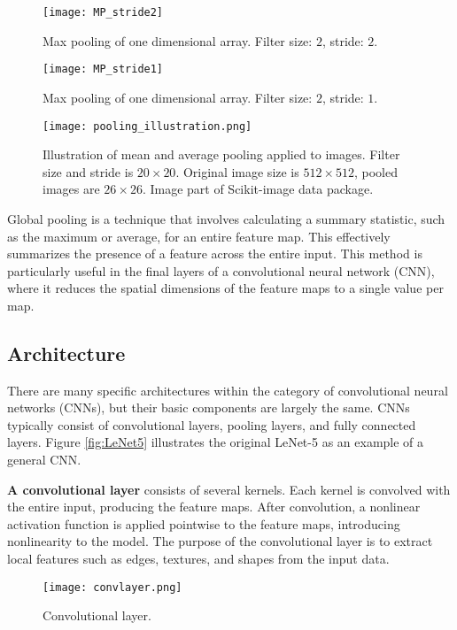 \documentclass[../../thesis.tex]{subfiles}
\begin{document}
\begin{figure}[h]
    \texttt{[image: MP\_stride2]}
    \centering    
    \caption{Max pooling of one dimensional array. Filter size: $2$, stride: $2$.}
    \label{fig:mp2}
\end{figure}
\begin{figure}[h]
    \texttt{[image: MP\_stride1]}
    \centering    
    \caption{Max pooling of one dimensional array. Filter size: $2$, stride: $1$.}
    \label{fig:mp1}
\end{figure}

\begin{figure}[h]
    \centering
    \texttt{[image: pooling\_illustration.png]}
    \caption{Illustration of mean and average pooling applied to images. Filter size and stride is $20\times 20$. Original image size is $512\times 512$, pooled images are $26\times26$. Image part of Scikit-image data package.}
    \label{fig:mean_max_pool}
\end{figure}

Global pooling is a technique that involves calculating a summary statistic, such as the maximum or average, for an entire feature map. This effectively summarizes the presence of a feature across the entire input. This method is particularly useful in the final layers of a convolutional neural network (CNN), where it reduces the spatial dimensions of the feature maps to a single value per map.

\subsection{Architecture}
There are many specific architectures within the category of convolutional neural networks (CNNs), but their basic components are largely the same. CNNs typically consist of convolutional layers, pooling layers, and fully connected layers. Figure \ref{fig:LeNet5} illustrates the original LeNet-5 \cite{LeCun1989ConvNet} as an example of a general CNN.\newline

\textbf{A convolutional layer} consists of several kernels. Each kernel is convolved with the entire input, producing the feature maps. After convolution, a nonlinear activation function is applied pointwise to the feature maps, introducing nonlinearity to the model. The purpose of the convolutional layer is to extract local features such as edges, textures, and shapes from the input data.
\begin{figure}[h]
    \centering
    \texttt{[image: convlayer.png]}
    \caption{Convolutional layer.}
    \label{fig:convlayer}
\end{figure}
\end{document}

